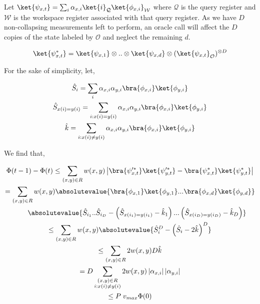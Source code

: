 Let $\ket{\psi_{x,t}}=\sum_{i}\alpha_{x,i}\ket{i}_{\mathcal{Q}}\ket{\phi_{x,i}}_{\mathcal{W}}$ where $\mathcal{Q}$ is the query register and $\mathcal{W}$ is the workspace register associated with that query register. As we have $D$ non-collapsing measurements left to perform, an oracle call will affect the $D$ copies of the state labeled by $\mathcal{O}$ and neglect the remaining $d$.\par


\[\begin{gathered}
\displaystyle\ket{\psi_{x,t}^{*}}=\ket{\psi_{x,1}}\otimes..\otimes\ket{\psi_{x,d}}\otimes(\ket{\psi_{x,t}}_{\mathcal{O}})^{\otimes D}
\end{gathered}\]




For the sake of simplicity, let,\par


\[\begin{gathered}
\displaystyle\hat{S}_{i} \displaystyle=\sum_{i}\alpha_{x,i}\alpha_{y,i}\bra{\phi_{x,i}}\ket{\phi_{y,i}} \\
\displaystyle\hat{S}_{x(i)=y(i)} \displaystyle=\sum_{i:x(i)=y(i)}\alpha_{x,i}\alpha_{y,i}\bra{\phi_{x,i}}\ket{\phi_{y,i}} \\
\displaystyle\hat{k} \displaystyle=\sum_{i:x(i)\neq y(i)}\alpha_{x,i}\alpha_{y,i}\bra{\phi_{x,i}}\ket{\phi_{y,i}}
\end{gathered}\]


We find that,\par


\[\begin{gathered}
\displaystyle\Phi(t-1)-\Phi(t)\leq \displaystyle\sum_{(x,y)\in R}w(x,y)\left|\bra{\psi_{x,t}^{\prime*}}\ket{\psi_{y,t}^{\prime*}}-\bra{\psi_{x,t}^{*}}\ket{\psi_{y,t}^{*}}\right| \\
\displaystyle= \displaystyle\sum_{(x,y)\in R}w(x,y)\absolutevalue{\bra{\phi_{x,1}}\ket{\phi_{y,1}}...\bra{\phi_{x,d}}\ket{\phi_{y,d}}} \\
\displaystyle\qquad\absolutevalue{\hat{S}_{i_{1}}..\hat{S}_{i_{D}}-\left(\hat{S}_{x(i_{1})=y(i_{1})}-\hat{k}_{1}\right)...\left(\hat{S}_{x(i_{D})=y(i_{D})}-\hat{k}_{D}\right)} \\
\displaystyle\leq \displaystyle\sum_{(x,y)\in R}w(x,y)\absolutevalue{\hat{S}_{i}^{D}-\left(\hat{S}_{i}-2\hat{k}\right)^{D}} \\
\displaystyle\leq \displaystyle\sum_{(x,y)\in R}2w(x,y)D\hat{k} \\
\displaystyle= \displaystyle D\sum_{\begin{subarray}{c}(x,y)\in R\\
i:x(i)\neq y(i)\end{subarray}}2w(x,y)\left|\alpha_{x,i}\right|\left|\alpha_{y,i}\right| \\
\displaystyle\leq \displaystyle P\;v_{max}\Phi(0)
\end{gathered}\]


